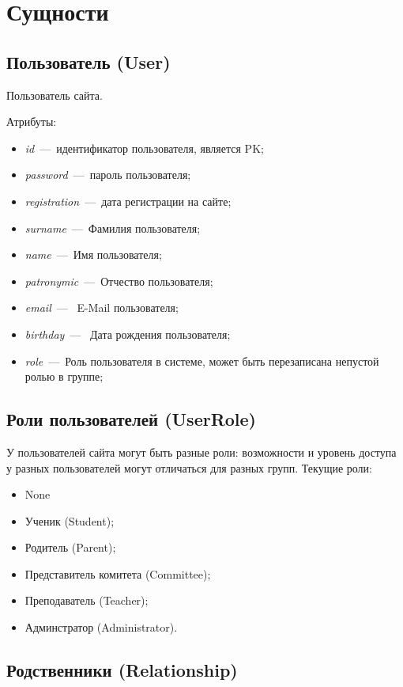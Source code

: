 \documentclass[14pt]{article}
\begin{document}
\section{Сущности}

\subsection{Пользователь (User)}

Пользователь сайта. 

Атрибуты:

\begin{itemize}
	\item \emph{id}~---~идентификатор пользователя, является PK;
	\item \emph{password}~---~пароль пользователя;
	\item \emph{registration}~---~дата регистрации на сайте;
	\item \emph{surname}~---~Фамилия пользователя;
	\item \emph{name}~---~Имя пользователя;
	\item \emph{patronymic}~---~Отчество пользователя;
	\item \emph{email}~---~ E-Mail пользователя;
	\item \emph{birthday}~---~ Дата рождения пользователя;
    \item \emph{role}~---~Роль пользователя в системе, может быть перезаписана непустой ролью в группе;
\end{itemize}

\subsection{Роли пользователей (UserRole)}

У пользователей сайта могут быть разные роли: возможности и уровень доступа у разных пользователей могут отличаться для разных групп.
Текущие роли:
\begin{itemize}
    \item None
	\item Ученик (Student);
	\item Родитель (Parent);
	\item Представитель комитета (Committee);
	\item Преподаватель (Teacher);
	\item Админстратор (Administrator).
\end{itemize}

\subsection{Родственники (Relationship)}
\end{document}
